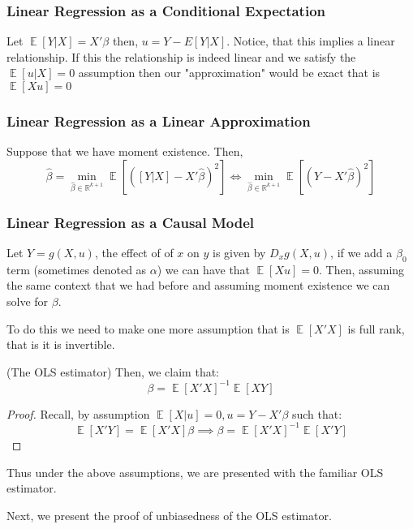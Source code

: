 \documentclass[dvips,11pt]{article}
\newcommand{\R}{\mathbb{R}}
\DeclareMathOperator{\?}{\,?\,}
\DeclareMathOperator{\E}{\mathbb{E}}
\newenvironment{remark}[1][Remark]{\begin{trivlist}
\item[\hskip \labelsep {\bfseries #1.}]}{\end{trivlist}}
\newenvironment{claim}[1]{\par\noindent{\bfseries Claim.}\space#1}{}
\begin{document}
 \subsubsection{Linear Regression as a Conditional Expectation}
 Let $\E[Y | X] = X'\beta$ then, $u = Y-E[Y|X]$. Notice, that this implies a linear relationship. If this the relationship is indeed linear and we satisfy the $\E[u|X] =0$ assumption then our "approximation" would be exact that is $\E[Xu] = 0$

 \subsubsection{Linear Regression as a Linear Approximation}

Suppose that we have moment existence. Then,
\begin{equation}
\hat\beta = \min_{\hat\beta \in \R^{k+1}} \E[([Y | X ] - X'\hat\beta)^2] \iff \min_{\hat\beta \in \R^{k+1}} \E[(Y - X'\hat\beta)^2] 
\end{equation}

\subsubsection{Linear Regression as a Causal Model}
Let $Y = g(X,u)$, the effect of of $x$ on $y$ is given by $D_xg(X,u)$, if we add a $\beta_0$ term (sometimes denoted as $\alpha$) we can have that $\E[Xu] = 0$. Then, assuming the same context that we had before and assuming moment existence we can solve for $\beta$.

To do this we need to make one more assumption that is $\E[X'X]$ is full rank, that is it is invertible. 

\begin{claim}{(The OLS estimator)} Then, we claim that: \begin{equation}\beta=\E[X'X]^{-1}\E[XY]\end{equation}
\end{claim}
\begin{proof}
Recall, by assumption $\E[X|u] = 0, u = Y-X'\beta$ such that:
$$\E[X'Y] = \E[X'X]\beta \implies \beta = \E[X'X]^{-1}\E[X'Y]$$
\end{proof}
\begin{remark}{} Thus under the above assumptions, we are presented with the familiar OLS estimator. 
\end{remark}
Next, we present the proof of unbiasedness of the OLS estimator.

\end{document}
